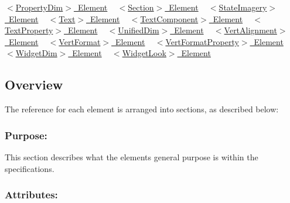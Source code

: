  \mbox{\hyperlink{fal_element_ref_fal_elem_ref_sec_28}{$<$\+Property\+Dim$>$ Element}} ~\newline
 \mbox{\hyperlink{fal_element_ref_fal_elem_ref_sec_29}{$<$\+Section$>$ Element}} ~\newline
 \mbox{\hyperlink{fal_element_ref_fal_elem_ref_sec_30}{$<$\+State\+Imagery$>$ Element}} ~\newline
 \mbox{\hyperlink{fal_element_ref_fal_elem_ref_sec_31}{$<$\+Text$>$ Element}} ~\newline
 \mbox{\hyperlink{fal_element_ref_fal_elem_ref_sec_32}{$<$\+Text\+Component$>$ Element}} ~\newline
 \mbox{\hyperlink{fal_element_ref_fal_elem_ref_sec_33}{$<$\+Text\+Property$>$ Element}} ~\newline
 \mbox{\hyperlink{fal_element_ref_fal_elem_ref_sec_34}{$<$\+Unified\+Dim$>$ Element}} ~\newline
 \mbox{\hyperlink{fal_element_ref_fal_elem_ref_sec_35}{$<$\+Vert\+Alignment$>$ Element}} ~\newline
 \mbox{\hyperlink{fal_element_ref_fal_elem_ref_sec_36}{$<$\+Vert\+Format$>$ Element}} ~\newline
 \mbox{\hyperlink{fal_element_ref_fal_elem_ref_sec_37}{$<$\+Vert\+Format\+Property$>$ Element}} ~\newline
 \mbox{\hyperlink{fal_element_ref_fal_elem_ref_sec_38}{$<$\+Widget\+Dim$>$ Element}} ~\newline
 \mbox{\hyperlink{fal_element_ref_fal_elem_ref_sec_39}{$<$\+Widget\+Look$>$ Element}} ~\newline
\hypertarget{fal_element_ref_fal_elem_ref_sec_1}{}\subsection{Overview}\label{fal_element_ref_fal_elem_ref_sec_1}
The reference for each element is arranged into sections, as described below\+:\hypertarget{fal_element_ref_fal_elem_ref_sec_1_1}{}\subsubsection{Purpose\+:}\label{fal_element_ref_fal_elem_ref_sec_1_1}
This section describes what the elements general purpose is within the specifications.\hypertarget{fal_element_ref_fal_elem_ref_sec_1_2}{}\subsubsection{Attributes\+:}\label{fal_element_ref_fal_elem_ref_sec_1_2}
